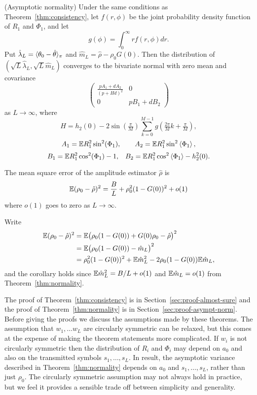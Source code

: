 \documentclass[journal]{IEEEtran}
\begin{document}
\begin{theorem}\label{thm:normality} (Asymptotic normality)
Under the same conditions as Theorem~\ref{thm:consistency}, let $f(r,\phi)$ be the joint probability density function of $R_1$ and $\Phi_1$, and let
\[
g(\phi) = \int_{0}^{\infty} r f(r,\phi) dr.
\]
Put $\hat{\lambda}_L = \langle \theta_0 - \hat{\theta} \rangle_\pi$ and $\hat{m}_L = \hat{\rho} - \rho_0 G(0)$. %
Then the distribution of $(\sqrt{L}\hat{\lambda}_L, \sqrt{L}\hat{m}_L)$ converges to the bivariate normal with zero mean and covariance
\[
\left( \begin{array}{cc} 
\frac{pA_1 + dA_2}{(p + H d)^2} & 0 \\
0 & pB_1 + dB_2
\end{array} \right)
\]
as $L \rightarrow \infty$, where
\[
H = h_2(0) -  2 \sin(\tfrac{\pi}{M}) \sum_{k = 0}^{M-1} g(\tfrac{2\pi}{M}k + \tfrac{\pi}{M}),
\]
\[
A_1 = {\mathbb E} R_1^2\sin^2(\Phi_1), \qquad A_2 = {\mathbb E} R_1^2\sin^2\left\langle \Phi_1 \right\rangle,
\]
\[
B_1 = {\mathbb E} R_1^2 \cos^2(\Phi_1) - 1, \;\;\; B_2 = {\mathbb E} R_1^2 \cos^2\left\langle \Phi_1 \right\rangle - h_2^2(0).
\]
\end{theorem}

\begin{corollary}\label{cor:ampmse}
The mean square error of the amplitude estimator $\hat{\rho}$ is 
\[
{\mathbb E} (\rho_0 - \hat{\rho})^2 = \frac{B}{L} + \rho_0^2(1 - G(0))^2 + o(1)
\] 
where $o(1)$ goes to zero as $L \rightarrow \infty$.
\end{corollary}
\begin{IEEEproof} Write
\begin{align*}
{\mathbb E} (\rho_0 - \hat{\rho})^2 &= {\mathbb E} \big( \rho_0(1 - G(0)) + G(0)\rho_0 - \hat{\rho} \big)^2 \\
&= {\mathbb E} \big( \rho_0(1 - G(0)) - \hat{m}_L \big)^2 \\
&= \rho_0^2(1 - G(0))^2 + {\mathbb E} \hat{m}_L^2 - 2\rho_0(1 - G(0)){\mathbb E}\hat{m}_L,
\end{align*} 
and the corollary holds since ${\mathbb E} \hat{m}_L^2 = B/L + o(1)$ and ${\mathbb E}\hat{m}_L = o(1)$ from Theorem~\ref{thm:normality}.
\end{IEEEproof}

The proof of Theorem~\ref{thm:consistency} is in Section~\ref{sec:proof-almost-sure} and the proof of Theorem~\ref{thm:normality} is in Section~\ref{sec:proof-asympt-norm}.  Before giving the proofs we discuss the assumptions made by these theorems.  The assumption that $w_1, \dots w_L$ are circularly symmetric can be relaxed, but this comes at the expense of making the theorem statements more complicated.  If $w_i$ is not circularly symmetric then the distribution of $R_i$ and $\Phi_i$ may depend on $a_0$ and also on the transmitted symbols $s_1, \dots, s_L$.  In result, the asymptotic variance described in Theorem~\ref{thm:normality} depends on $a_0$ and $s_1, \dots, s_L$, rather than just $\rho_0$.  The circularly symmetric assumption may not always hold in practice, but we feel it provides a sensible trade off between simplicity and generality.
\end{document}
